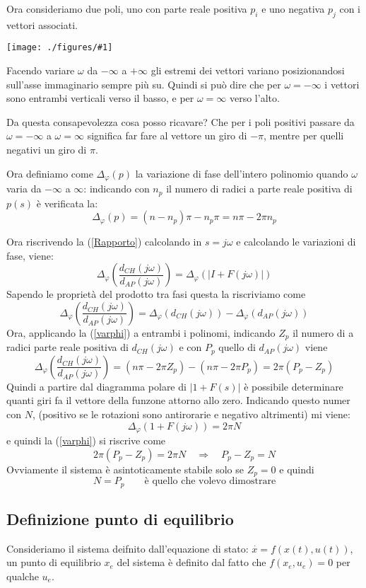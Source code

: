 \documentclass{article}
\newcommand{\incfig}[2]{%
	\texttt{[image: ./figures/\#1]}%
}
\begin{document}
Ora consideriamo due poli, uno con parte reale positiva $p_i$ e uno negativa $p_j$  con i vettori associati.

\incfig{pipj.jpeg}{0.5}

Facendo variare $\omega$ da $-\infty$ a $+\infty$ gli estremi dei vettori variano posizionandosi
sull'asse immaginario sempre più su. Quindi si può dire che per $\omega=-\infty$ i vettori sono entrambi verticali verso il basso,
e per $\omega=\infty$ verso l'alto.

Da questa consapevolezza cosa posso ricavare? Che per i poli positivi passare da $\omega=-\infty$ a $\omega=\infty$
significa far fare al vettore un giro di $-\pi$, mentre per quelli negativi un giro di $\pi$.

Ora definiamo come $\Delta_{\varphi}(p)$ la variazione di fase dell'intero polinomio
quando $\omega$ varia da $-\infty$ a $\infty$: indicando con $n_p$ il numero di radici a parte reale positiva di $p(s)$
è verificata la:
\begin{equation}\label{varphi}
    \Delta_{\varphi}(p) = (n-n_p)\pi-n_p\pi=n\pi-2\pi n_p
\end{equation}

Ora riscrivendo la (\ref{Rapporto}) calcolando in $s = j\omega$ e calcolando le variazioni di fase,
viene:
\[
\Delta_{\varphi}\left(\frac{d_{CH}(j\omega)}{d_{AP}(j\omega)} \right)= \Delta_{\varphi}\left(|I+F(j\omega)|\right)
\]
Sapendo le proprietà del prodotto tra fasi questa la riscriviamo come
\[
    \Delta_{\varphi}\left(\frac{d_{CH}(j\omega)}{d_{AP}(j\omega)} \right)=
    \Delta_{\varphi}(d_{CH}(j\omega))-\Delta_{\varphi}(d_{AP}(j\omega))
\]
Ora, applicando la (\ref{varphi}) a entrambi i polinomi, indicando $Z_p$ il numero di a radici parte reale positiva
di $d_{CH}(j\omega)$ e con $P_p$ quello di $d_{AP}(j\omega)$ viene
\[
    \Delta_{\varphi}\left(\frac{d_{CH}(j\omega)}{d_{AP}(j\omega)} \right)=
    (n\pi-2\pi Z_p)-(n\pi-2\pi P_p)=2\pi(P_p-Z_p )
\]
Quindi a partire dal diagramma polare di $|1+F(s)|$ è possibile determinare quanti giri 
fa il vettore della funzone attorno allo zero. Indicando questo numer con $N$,
(positivo se le rotazioni sono antirorarie e negativo altrimenti) mi viene:
\[
\Delta_{\varphi}(1+F(j\omega))=2\pi N    
\]
e quindi la (\ref{varphi}) si riscrive come 
\[
    2\pi(P_p-Z_p )=2\pi N \quad \Longrightarrow \quad P_p-Z_p = N
\]
Ovviamente il sistema è asintoticamente stabile solo se $Z_p=0$ e quindi 
\[N= P_p\quad\quad \text{è quello che volevo dimostrare}\]


\subsection{Definizione punto di equilibrio}
Consideriamo il sistema deifnito dall'equazione di stato: $ \overset{\cdot}{x} = f(x(t),u(t)) $, un punto di 
equilibrio $x_e$ del sistema è definito dal fatto che $f(x_e,u_e) = 0$ per qualche $u_e$.
\end{document}
